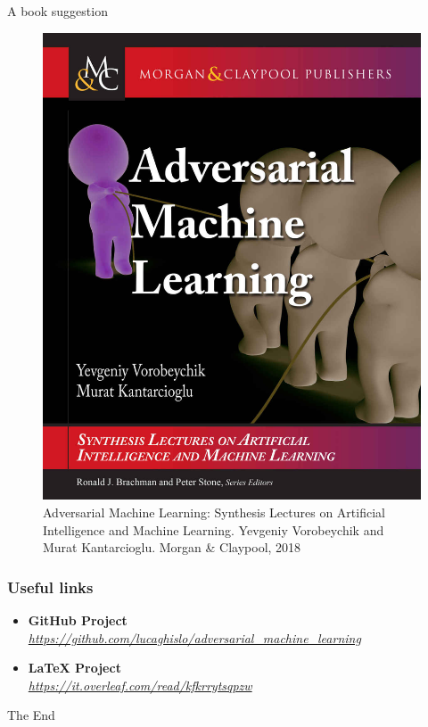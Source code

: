 \documentclass[8pt]{beamer}
\begin{document}
\begin{frame}{A book suggestion}
    \begin{figure} 
    \includegraphics[scale=0.4]{images/adv_book.jpg}
    \caption{Adversarial Machine Learning: Synthesis Lectures on Artificial Intelligence and Machine Learning. Yevgeniy Vorobeychik and Murat Kantarcioglu. Morgan \& Claypool, 2018}
    \end{figure}
\end{frame}

\begin{frame}
\frametitle{Useful links}
\begin{itemize}
\item \textbf{GitHub Project}\\\href{https://github.com/lucaghislo/adversarial_machine_learning}{\textit{https://github.com/lucaghislo/adversarial\_machine\_learning}}
\vspace{0.5cm}
\item \textbf{LaTeX Project}\\\href{https://it.overleaf.com/read/kfkrrytsqpzw}{\textit{https://it.overleaf.com/read/kfkrrytsqpzw}}
\end{itemize}
\end{frame}

\begin{frame}
\Huge{\centerline{The End}}
\end{frame}
\end{document}
